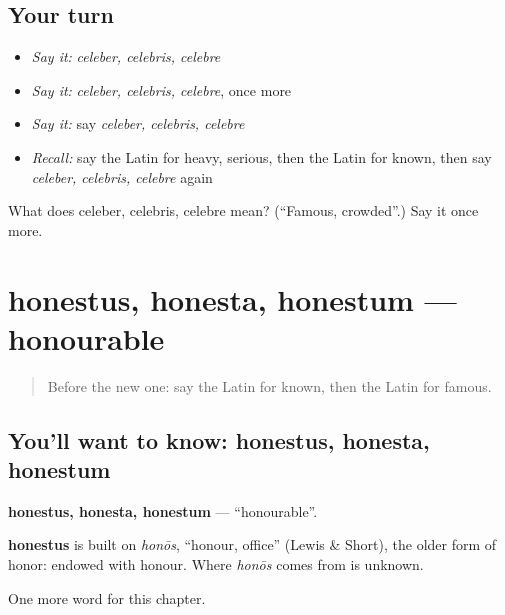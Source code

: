 \subsection*{Your turn}
\begin{itemize}
\raggedright
  \item \emph{Say it:} \emph{celeber, celebris, celebre}
  \item \emph{Say it:} \emph{celeber, celebris, celebre}, once more
  \item \emph{Say it:} say \emph{celeber, celebris, celebre}
  \item \emph{Recall:} say the Latin for heavy, serious, then the Latin for known, then say \emph{celeber, celebris, celebre} again
\end{itemize}

\begin{tcolorbox}[breakable,colback=teal!4,colframe=teal!35!black,title={Before you move on}]
What does celeber, celebris, celebre mean? (\textquotedblleft{}Famous, crowded\textquotedblright{}.) Say it once more.
\end{tcolorbox}
\section[honestus, honesta, honestum]{honestus, honesta, honestum — honourable}

\label{lesson:LA-C183-honestus}



\begin{quote}
Before the new one: say the Latin for known, then the Latin for famous.
\end{quote}

\subsection*{You'll want to know: honestus, honesta, honestum}
\textbf{honestus, honesta, honestum} — \textquotedblleft{}honourable\textquotedblright{}.

\begin{cousinweb}
\textbf{honestus} is built on \emph{honōs}, \textquotedblleft{}honour, office\textquotedblright{} (Lewis \& Short), the older form of honor: endowed with honour. Where \emph{honōs} comes from is unknown.
\end{cousinweb}

\begin{grammarlens}[title={What you've built}]
One more word for this chapter.
\end{grammarlens}

